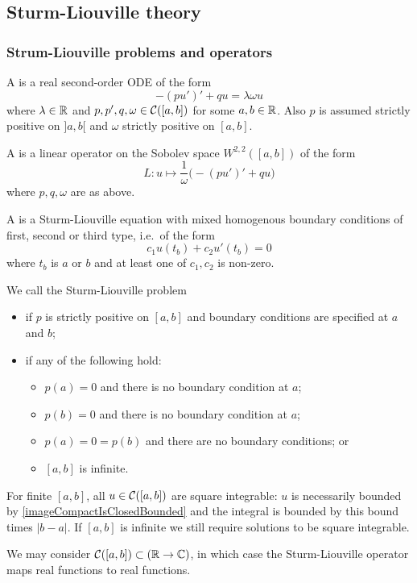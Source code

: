 \subsection{Sturm-Liouville theory}
\subsubsection{Strum-Liouville problems and operators}
\begin{definition}
A  is a real second-order ODE of the form
\[ -(pu')' + qu = \lambda \omega u \]
where $\lambda\in\mathbb{R}$ and $p,p',q,\omega\in \operatorname{\mathcal{C}}([a,b])$ for some $a,b\in \mathbb{R}$. Also $p$ is assumed strictly positive on $]a,b[$ and $\omega$ strictly positive on $[a,b]$.

A  is a linear operator on the Sobolev space $W^{2,2}([a,b])$ of the form
\[ L: u\mapsto \frac{1}{\omega}\Big(-(pu')' + qu\Big) \]
where $p,q, \omega$ are as above.

A  is a Sturm-Liouville equation with mixed homogenous boundary conditions of first, second or third type, i.e.\ of the form
\[ c_1 u(t_b) + c_2 u'(t_b) = 0 \]
where $t_b$ is $a$ or $b$ and at least one of $c_1,c_2$ is non-zero.

We call the Sturm-Liouville problem
\begin{itemize}
\item {} if $p$ is strictly positive on $[a,b]$ and boundary conditions are specified at $a$ and $b$;
\item {} if any of the following hold:
\begin{itemize}
\item $p(a) = 0$ and there is no boundary condition at $a$;
\item $p(b) = 0$ and there is no boundary condition at $a$;
\item $p(a) = 0 = p(b)$ and there are no boundary conditions; or
\item $[a,b]$ is infinite.
\end{itemize}
\end{itemize}
\end{definition}
For finite $[a,b]$, all $u\in\operatorname{\mathcal{C}}([a,b])$ are square integrable: $u$ is necessarily bounded by \ref{imageCompactIsClosedBounded} and the integral is bounded by this bound times $|b-a|$. If $[a,b]$ is infinite we still require solutions to be square integrable.

We may consider $\operatorname{\mathcal{C}}([a,b]) \subset (\mathbb{R}\to\mathbb{C})$, in which case the Sturm-Liouville operator maps real functions to real functions.

